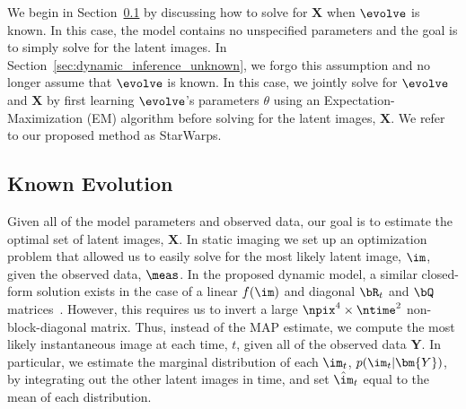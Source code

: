 We begin in Section~\ref{sec:dynamic_inference_known} by discussing how to solve for $\bm{X}$ when $\evolve$ is known. In this case, the model contains no unspecified parameters and the goal is to simply solve for the latent images. 
In Section~\ref{sec:dynamic_inference_unknown}, we forgo this assumption and no longer assume that $\evolve$ is known. In this case, we jointly solve for $\evolve$ and $\bm{X}$ by first learning $\evolve$'s parameters $\theta$ using an Expectation-Maximization (EM) algorithm before solving for the latent images, $\bm{X}$. We refer to our proposed method as StarWarps. 













\subsection{Known Evolution}
\label{sec:dynamic_inference_known}

Given all of the model parameters and observed data, our goal is to estimate the optimal set of latent images, $\bm{X}$. 
In static imaging we set up an optimization problem that allowed us to easily solve for the most likely latent image, $\im$, given the observed data, $\meas$. 
In the proposed dynamic model, a similar closed-form solution exists in the case of a linear $f(\im)$ and diagonal $\bR_t$ and $\bQ$ matrices~\cite{fessler}. However, this requires us to invert a large $\npix^4 \times \ntime^2$ non-block-diagonal matrix.   
Thus, instead of the MAP estimate, we compute the most likely instantaneous image at each time, $t$, given all of the observed data $\bm{Y}$.
In particular, we estimate the marginal distribution of each $\im_t$, $p(\im_t | \bm{Y})$, by integrating out the other latent images in time, and set $\hat{\im}_t$ equal to the mean of each distribution. 



